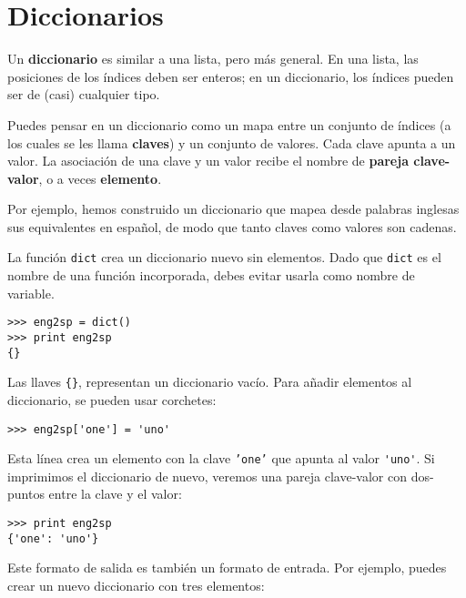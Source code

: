
\chapter{Diccionarios}


Un {\bf diccionario} es similar a una lista, pero más general. En una lista,
las posiciones de los índices deben ser enteros; en un diccionario,
los índices pueden ser de (casi) cualquier tipo.

Puedes pensar en un diccionario como un mapa entre un conjunto de índices
(a los cuales se les llama {\bf claves}) y un conjunto de valores. Cada clave apunta a un
valor. La asociación de una clave y un valor recibe el nombre de {\bf
pareja clave-valor}, o a veces {\bf elemento}.

Por ejemplo, hemos construido un diccionario que mapea desde palabras inglesas
sus equivalentes en español, de modo que tanto claves como valores son cadenas.

La función {\tt dict} crea un diccionario nuevo sin elementos.
Dado que {\tt dict} es el nombre de una función incorporada, debes
evitar usarla como nombre de variable.


\beforeverb
\begin{verbatim}
>>> eng2sp = dict()
>>> print eng2sp
{}
\end{verbatim}
\afterverb

Las llaves \verb"{}", representan un diccionario vacío.
Para añadir elementos al diccionario, se pueden usar corchetes:


\beforeverb
\begin{verbatim}
>>> eng2sp['one'] = 'uno'
\end{verbatim}
\afterverb
%
Esta línea crea un elemento con la clave {\tt 'one'}
que apunta al valor \verb"'uno'". Si imprimimos el
diccionario de nuevo, veremos una pareja clave-valor con dos-puntos
entre la clave y el valor:

\beforeverb
\begin{verbatim}
>>> print eng2sp
{'one': 'uno'}
\end{verbatim}
\afterverb
%
Este formato de salida es también un formato de entrada. Por ejemplo,
puedes crear un nuevo diccionario con tres elementos:

